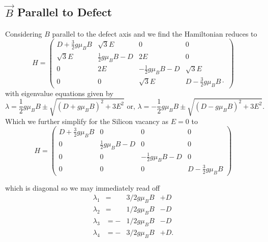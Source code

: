 \subsection{$\vec{B}$ Parallel to Defect}
Considering $B$ parallel to the defect axis and  we find \cite{Kirmse1995} the Hamiltonian reduces to
\begin{equation}
	H = \begin{pmatrix}
		D + \frac{3}{2} g \mu_B B & \sqrt{3}E               & 0                        & 0                               \\
		\sqrt{3}E                 & \frac{1}{2}g \mu_B B -D & 2E                       & 0                               \\
		0                         & 2E                      & -\frac{1}{2}g\mu_B B - D & \sqrt{3}E                       \\
		0                         & 0                       & \sqrt{3}E                & D - \frac{3}{2} g \mu_B B \cdot
	\end{pmatrix}%
	\label{eq:}
\end{equation}
with eigenvalue equations given by
\begin{equation}
	\lambda = \frac{1}{2}g\mu_B B \pm \sqrt{(D + g\mu_B B)^2 + 3E^2}
	\text{ or, }
	\lambda = -\frac{1}{2} g\mu_B B \pm \sqrt{(D-g\mu_B B)^2 + 3E^2}.
\end{equation}
Which we further simplify for the Silicon vacancy as $E=0$ \cite{Nagy2019} to
\begin{equation}
	H = \begin{pmatrix}
		D + \frac{3}{2} g \mu_B B & 0                       & 0                        & 0                         \\
		0                         & \frac{1}{2}g \mu_B B -D & 0                        & 0                         \\
		0                         & 0                       & -\frac{1}{2}g\mu_B B - D & 0                         \\
		0                         & 0                       & 0                        & D - \frac{3}{2} g \mu_B B
	\end{pmatrix}%
	\label{eq:}
\end{equation}

which is diagonal so we may immediately read off
\begin{equation}
	\begin{align}
		\lambda_1 & =   & 3/2   g \mu_B B & +  D  \\
		\lambda_2 & =   & 1/2   g \mu_B B & -D    \\
		\lambda_3 & = - & 1/2  g \mu_B B  & -D    \\
		\lambda_4 & = - & 3/2  g \mu_B B  & +  D.
	\end{align}
	\label{eq:spin1.5_magnet_Bparallel_eigenvalues}
\end{equation}



